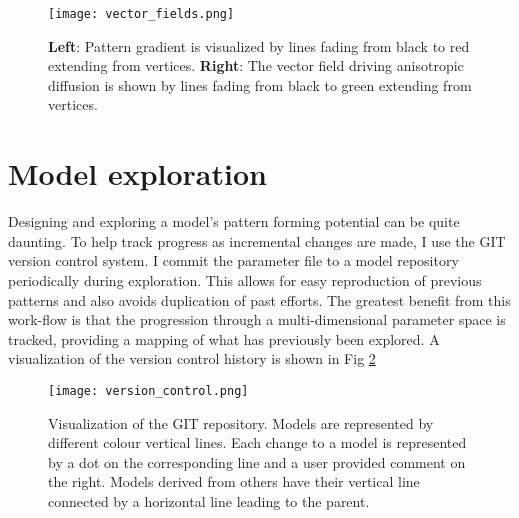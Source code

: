 \begin{figure}[ht]
	\centering
	\texttt{[image: vector\_fields.png]}	
	\caption{\textbf{Left}: Pattern gradient is visualized by lines fading from black to red extending from vertices. \textbf{Right}: The vector field driving anisotropic diffusion is shown by lines fading from black to green extending from vertices.} 
	\label{fig:vector_fields}
\end{figure}

\section{Model exploration}
Designing and exploring a model's pattern forming potential can be quite daunting. To help track progress as incremental changes are made, I use the GIT version control system. I commit the parameter file to a model repository periodically during exploration. This allows for easy reproduction of previous patterns and also avoids duplication of past efforts. The greatest benefit from this work-flow is that the progression through a multi-dimensional parameter space is tracked, providing a mapping of what has previously been explored. A visualization of the version control history is shown in Fig \ref{fig:version_control}

\begin{figure}[h]
	\centering
	\texttt{[image: version\_control.png]}	
	\caption{Visualization of the GIT repository. Models are represented by different colour vertical lines. Each change to a model is represented by a dot on the corresponding line and a user provided comment on the right. Models derived from others have their vertical line connected by a horizontal line leading to the parent. } 
	\label{fig:version_control}
\end{figure}